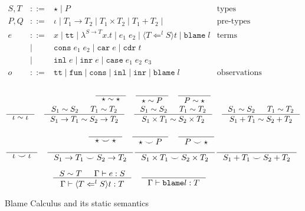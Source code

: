 \documentclass[acmsmall,review,anonymous]{acmart}\settopmatter{printfolios=true,printccs=false,printacmref=false}
\newcommand{\stxrule}[3]{#1 & ::= & #3 & \text{#2}\\}
\newcommand{\stxrulecont}[1]{& | & #1 & \\}
\newcommand{\plus}[0]{+}
\newcommand{\judgetype}[3]{#1 \vdash #2 : #3}
\begin{document}
\begin{figure}
	\[
	\begin{array}{lclr}
	\stxrule{S,T}{types}{
		\star \mid{}
		P
	}
	\stxrule{P,Q}{pre-types}{
		\iota \mid{}
		T_1 \rightarrow T_2 \mid{}
		T_1 \times T_2 \mid{}
		T_1 \plus T_2 \mid{}
	}
	\stxrule{e}{terms}{
		x \mid{}
		\mathtt{tt} \mid{}
		\lambda^{S\rightarrow{}T}x.t \mid{}
		e_1 \; e_2 \mid{}
		\langle T \Leftarrow^l S \rangle t \mid{}
		\mathtt{blame} \; l
	}
	\stxrulecont{
		\mathtt{cons}\; e_1 \; e_2 \mid{}
		\mathtt{car}\; e \mid{}
		\mathtt{cdr}\; t
	}
	\stxrulecont{
		\mathtt{inl} \; e \mid{}
		\mathtt{inr} \; e \mid{}
		\mathtt{case}\; e_1 \; e_2 \; e_3
	}
	\stxrule{o}{observations}{
		\mathtt{tt} \mid{}
		\mathtt{fun}\mid{}
		\mathtt{cons}\mid{}
		\mathtt{inl}\mid{}
		\mathtt{inr}\mid{}
		\mathtt{blame}\; l
	}
	\end{array}
	\]
	
	\begin{gather*}
	\inference{}{
		\star \sim \star
	} \quad
	\inference{}{
		\star \sim P
	} \quad
	\inference{}{
		P \sim \star
	} \\
	\inference{}{
		\iota \sim \iota
	} \quad
	\inference{
		S_1 \sim S_2 &
		T_1 \sim T_2
	}{
		S_1 \rightarrow T_1 \sim S_2 \rightarrow T_2
	} \quad
	\inference{
		S_1 \sim S_2 &
		T_1 \sim T_2
	}{
		S_1 \times T_1 \sim S_2 \times T_2
	} \quad
	\inference{
		S_1 \sim S_2 &
		T_1 \sim T_2
	}{
		S_1 \plus T_1 \sim S_2 \plus T_2
	}
	\end{gather*}
	
	\begin{gather*}
	\inference{}{
		\star \smile \star
	} \quad
	\inference{}{
		\star \smile P
	} \quad
	\inference{}{
		P \smile \star
	} \\
	\inference{}{
		\iota \smile \iota
	} \quad
	\inference{}{
		S_1 \rightarrow T_1 \smile S_2 \rightarrow T_2
	}
	\inference{}{
	S_1 \times T_1 \smile S_2 \times T_2
	}
	\inference{}{
	S_1 \plus T_1 \smile S_2 \plus T_2
	}
	\end{gather*}
	
	\begin{gather*}
		\inference{
			S \sim T & \Gamma \vdash e : S 
		}{
			\judgetype{\Gamma}{\langle T \Leftarrow^l S \rangle t}{T}
		} \quad
		\inference{
		}{
			\judgetype{\Gamma}{\mathtt{blame} l}{T}
		}
	\end{gather*}
	
	\caption{Blame Calculus and its static semantics}
	\label{fig:blame-static}
\end{figure}
\end{document}
